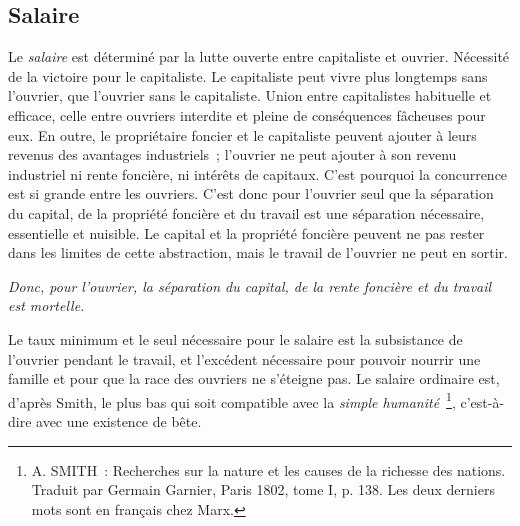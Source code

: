\documentclass[french,twoside]{book} %
\begin{document}
\subsection[{Salaire}]{Salaire}
\noindent [I] Le \emph{salaire} est déterminé par la lutte ouverte entre capitaliste et ouvrier. Nécessité de la victoire pour le capitaliste. Le capitaliste peut vivre plus longtemps sans l’ouvrier, que l’ouvrier sans le capitaliste. Union entre capitalistes habituelle et efficace, celle entre ouvriers interdite et pleine de conséquences fâcheuses pour eux. En outre, le propriétaire foncier et le capitaliste peuvent ajouter à leurs revenus des avantages industriels ; l’ouvrier ne peut ajouter à son revenu industriel ni rente foncière, ni intérêts de capitaux. C’est pourquoi la concurrence est si grande entre les ouvriers. C’est donc pour l’ouvrier seul que la séparation du capital, de la propriété foncière et du travail est une séparation nécessaire, essentielle et nuisible. Le capital et la propriété foncière peuvent ne pas rester dans les limites de cette abstraction, mais le travail de l’ouvrier ne peut en sortir.\par
\emph{Donc, pour l’ouvrier, la séparation du capital, de la rente foncière et du travail est mortelle.}\par
Le taux minimum et le seul nécessaire pour le salaire est la subsistance de l’ouvrier pendant le travail, et l’excédent nécessaire pour pouvoir nourrir une famille et pour que la race des ouvriers ne s’éteigne pas. Le salaire ordinaire est, d’après Smith, le plus bas qui soit compatible avec la \emph{simple humanité} \footnote{A. SMITH : Recherches sur la nature et les causes de la richesse des nations. Traduit par Germain Garnier, Paris 1802, tome I, p. 138. Les deux derniers mots sont en français chez Marx.}, c’est-à-dire avec une existence de bête.\par
\end{document}
